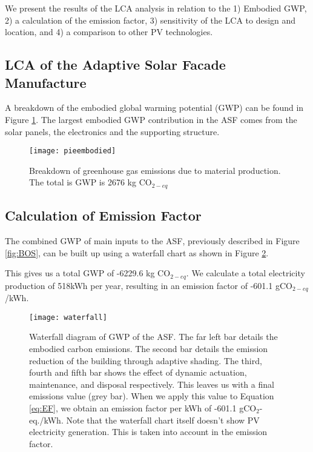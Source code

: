 
We present the results of the LCA analysis in relation to the 1) Embodied GWP, 2) a calculation of the emission factor, 3) sensitivity of the LCA to design and location, and 4) a comparison to other PV technologies.

\subsection{LCA of the Adaptive Solar Facade Manufacture}

A breakdown of the embodied global warming potential (GWP) can be found in Figure  \ref{fig:embodied}. The largest embodied GWP contribution in the ASF comes from the solar panels, the electronics and the supporting structure.

\begin{figure}[H]
\begin{center}
\texttt{[image: pieembodied]}
\caption{Breakdown of greenhouse gas emissions due to material production. The total is GWP is 2676 kg CO$_{2-eq}$}
\label{fig:embodied}
\end{center}
\end{figure}

\subsection{Calculation of Emission Factor}
The combined GWP of main inputs to the ASF, previously described in Figure \ref{fig:BOS}, can be built up using a waterfall chart as shown in Figure \ref{fig:waterfall}. 

This gives us a total GWP of -6229.6 kg CO$_{2-eq}$. We calculate a total electricity production of 518kWh per year, resulting in an emission factor of -601.1 gCO$_{2-eq}$/kWh.

\begin{figure}[H]
\begin{center}
\texttt{[image: waterfall]}
\caption{Waterfall diagram of GWP of the ASF. The far left bar details the embodied carbon emissions. The second bar details the emission reduction of the building through adaptive shading. The third, fourth and fifth bar shows the effect of dynamic actuation, maintenance, and disposal respectively. This leaves us with a final emissions value (grey bar). When we apply this value to Equation \ref{eq:EF}, we obtain an emission factor per kWh of -601.1 gCO$_2$-eq./kWh. Note that the waterfall chart itself doesn't show PV electricity generation. This is taken into account in the emission factor.}

\label{fig:waterfall}
\end{center}
\end{figure}

